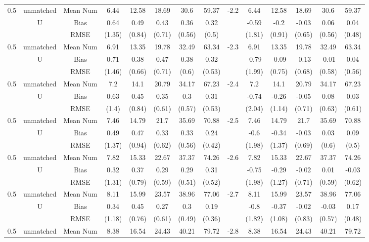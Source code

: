 \begin{tabular}{@{\extracolsep{5pt}}lc|cccccc|lccccc}
0.5 & unmatched & Mean Num & 6.44 & 12.58 & 18.69 & 30.6 & 59.37 & -2.2 & 6.44 & 12.58 & 18.69 & 30.6 & 59.37 \\
 & U & Bias & 0.64 & 0.49 & 0.43 & 0.36 & 0.32 &  & -0.59 & -0.2 & -0.03 & 0.06 & 0.04 \\
 &  & RMSE & (1.35) & (0.84) & (0.71) & (0.56) & (0.5) &  & (1.81) & (0.91) & (0.65) & (0.56) & (0.48) \\
0.5 & unmatched & Mean Num & 6.91 & 13.35 & 19.78 & 32.49 & 63.34 & -2.3 & 6.91 & 13.35 & 19.78 & 32.49 & 63.34 \\
 & U & Bias & 0.71 & 0.38 & 0.47 & 0.38 & 0.32 &  & -0.79 & -0.09 & -0.13 & -0.01 & 0.04 \\
 &  & RMSE & (1.46) & (0.66) & (0.71) & (0.6) & (0.53) &  & (1.99) & (0.75) & (0.68) & (0.58) & (0.56) \\
0.5 & unmatched & Mean Num & 7.2 & 14.1 & 20.79 & 34.17 & 67.23 & -2.4 & 7.2 & 14.1 & 20.79 & 34.17 & 67.23 \\
 & U & Bias & 0.63 & 0.45 & 0.35 & 0.3 & 0.31 &  & -0.74 & -0.26 & -0.05 & 0.08 & 0.03 \\
 &  & RMSE & (1.4) & (0.84) & (0.61) & (0.57) & (0.53) &  & (2.04) & (1.14) & (0.71) & (0.63) & (0.61) \\
0.5 & unmatched & Mean Num & 7.46 & 14.79 & 21.7 & 35.69 & 70.88 & -2.5 & 7.46 & 14.79 & 21.7 & 35.69 & 70.88 \\
 & U & Bias & 0.49 & 0.47 & 0.33 & 0.33 & 0.24 &  & -0.6 & -0.34 & -0.03 & 0.03 & 0.09 \\
 &  & RMSE & (1.37) & (0.94) & (0.62) & (0.56) & (0.42) &  & (1.98) & (1.37) & (0.69) & (0.6) & (0.5) \\
0.5 & unmatched & Mean Num & 7.82 & 15.33 & 22.67 & 37.37 & 74.26 & -2.6 & 7.82 & 15.33 & 22.67 & 37.37 & 74.26 \\
 & U & Bias & 0.32 & 0.37 & 0.29 & 0.29 & 0.31 &  & -0.75 & -0.29 & -0.02 & 0.01 & -0.03 \\
 &  & RMSE & (1.31) & (0.79) & (0.59) & (0.51) & (0.52) &  & (1.98) & (1.27) & (0.71) & (0.59) & (0.62) \\
0.5 & unmatched & Mean Num & 8.11 & 15.99 & 23.57 & 38.96 & 77.06 & -2.7 & 8.11 & 15.99 & 23.57 & 38.96 & 77.06 \\
 & U & Bias & 0.34 & 0.45 & 0.27 & 0.3 & 0.19 &  & -0.8 & -0.37 & -0.02 & -0.03 & 0.17 \\
 &  & RMSE & (1.18) & (0.76) & (0.61) & (0.49) & (0.36) &  & (1.82) & (1.08) & (0.83) & (0.57) & (0.48) \\
0.5 & unmatched & Mean Num & 8.38 & 16.54 & 24.43 & 40.21 & 79.72 & -2.8 & 8.38 & 16.54 & 24.43 & 40.21 & 79.72 \\

\end{tabular}
